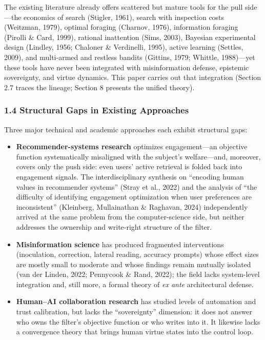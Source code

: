 \documentclass[
  11pt]{article}
\providecommand{\tightlist}{%
  \setlength{\itemsep}{0pt}\setlength{\parskip}{0pt}}
\begin{document}
The existing literature already offers scattered but mature tools for
the pull side---the economics of search (Stigler, 1961), search with
inspection costs (Weitzman, 1979), optimal foraging (Charnov, 1976),
information foraging (Pirolli \& Card, 1999), rational inattention
(Sims, 2003), Bayesian experimental design (Lindley, 1956; Chaloner \&
Verdinelli, 1995), active learning (Settles, 2009), and multi-armed and
restless bandits (Gittins, 1979; Whittle, 1988)---yet these tools have
never been integrated with misinformation defense, epistemic
sovereignty, and virtue dynamics. This paper carries out that
integration (Section 2.7 traces the lineage; Section 8 presents the
unified theory).

\subsubsection{1.4 Structural Gaps in Existing
Approaches}\label{structural-gaps-in-existing-approaches}

Three major technical and academic approaches each exhibit structural
gaps:

\begin{itemize}
\tightlist
\item
  \textbf{Recommender-systems research} optimizes engagement---an
  objective function systematically misaligned with the subject's
  welfare---and, moreover, covers only the push side: even users' active
  retrieval is folded back into engagement signals. The
  interdisciplinary synthesis on ``encoding human values in recommender
  systems'' (Stray et al., 2022) and the analysis of ``the difficulty of
  identifying engagement optimization when user preferences are
  inconsistent'' (Kleinberg, Mullainathan \& Raghavan, 2024)
  independently arrived at the same problem from the computer-science
  side, but neither addresses the ownership and write-right structure of
  the filter.
\item
  \textbf{Misinformation science} has produced fragmented interventions
  (inoculation, correction, lateral reading, accuracy prompts) whose
  effect sizes are mostly small to moderate and whose findings remain
  mutually isolated (van der Linden, 2022; Pennycook \& Rand, 2022); the
  field lacks system-level integration and, still more, a formal theory
  of \emph{ex ante} architectural defense.
\item
  \textbf{Human--AI collaboration research} has studied levels of
  automation and trust calibration, but lacks the ``sovereignty''
  dimension: it does not answer who owns the filter's objective function
  or who writes into it. It likewise lacks a convergence theory that
  brings human virtue states into the control loop.
\end{itemize}
\end{document}
